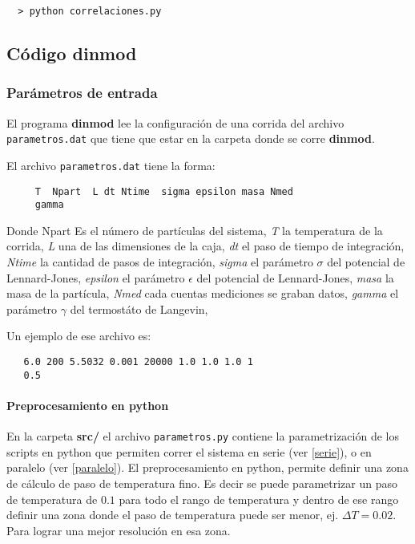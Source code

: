 \begin{verbatim}
  > python correlaciones.py 
\end{verbatim}



\subsection{C\'odigo dinmod}

\subsubsection{Par\'ametros de entrada}

El programa \textbf{\textbf{dinmod}} lee la configuraci\'on de una corrida del 
archivo \texttt{parametros.dat} que tiene que estar en la carpeta donde se
corre \textbf{\textbf{dinmod}}.

El archivo \texttt{parametros.dat} tiene la forma: 

\begin{verbatim}
     T  Npart  L dt Ntime  sigma epsilon masa Nmed
     gamma
\end{verbatim}

Donde Npart
Es el número de partículas del sistema, \textit{T} la temperatura de la corrida,
\textit{L} una de las dimensiones de la caja, \textit{dt} el paso de tiempo de integración,
\textit{Ntime} la cantidad de pasos de integración,
\textit{sigma} el parámetro $\sigma$ del potencial de Lennard-Jones,
\textit{epsilon} el parámetro $\epsilon$ del potencial de Lennard-Jones,
\textit{masa} la masa de la partícula,
\textit{Nmed} cada cuentas mediciones se graban datos,
\textit{gamma} el parámetro $\gamma$ del termostáto de Langevin,



Un ejemplo de ese archivo es:

\begin{verbatim}
   6.0 200 5.5032 0.001 20000 1.0 1.0 1.0 1
   0.5
\end{verbatim}


\paragraph{Preprocesamiento en python}

En la carpeta \textbf{src/} el archivo \texttt{parametros.py} contiene la 
parametrizaci\'on de los scripts en python que permiten correr el sistema en 
serie (ver \eqref{serie}), 
o en paralelo (ver \eqref{paralelo}).
El preprocesamiento en python, permite definir una zona de c\'alculo de paso
de temperatura fino. Es decir se puede parametrizar un paso de temperatura de
$0.1$ para todo el rango de temperatura y dentro de ese rango definir una zona
donde el paso de temperatura puede ser menor, ej. $\Delta T = 0.02$. Para 
lograr una mejor resoluci\'on
en esa zona.

